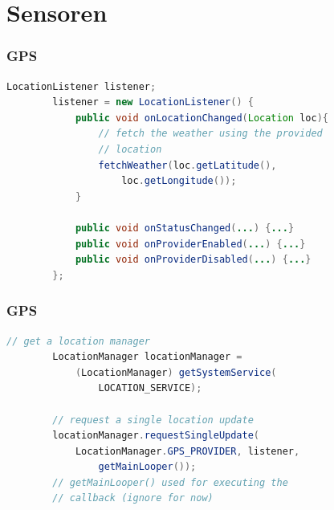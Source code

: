 \section{Sensoren}

\begin{frame}[c,fragile]
	\frametitle{GPS}
	\vspace{-3mm}
	\begin{lstlisting}[language=Java]
		LocationListener listener;
		listener = new LocationListener() {
		    public void onLocationChanged(Location loc){
		    	// fetch the weather using the provided
		    	// location
		        fetchWeather(loc.getLatitude(),
		            loc.getLongitude()); 
		    }

		    public void onStatusChanged(...) {...}
		    public void onProviderEnabled(...) {...}
		    public void onProviderDisabled(...) {...}
		};
    \end{lstlisting}	
	
\end{frame}

\begin{frame}[c,fragile]
	\frametitle{GPS}
	\begin{lstlisting}[language=Java]
		// get a location manager
		LocationManager locationManager =
		    (LocationManager) getSystemService(
		        LOCATION_SERVICE);

		// request a single location update
		locationManager.requestSingleUpdate(
		    LocationManager.GPS_PROVIDER, listener,
		        getMainLooper());
		// getMainLooper() used for executing the
		// callback (ignore for now)
    \end{lstlisting}
\end{frame}

